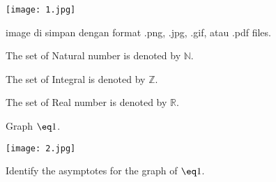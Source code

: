 \documentclass[11pt]{article}
\begin{document}
	
	\begin{center}
	\texttt{[image: 1.jpg]}
	
	image di simpan dengan format .png, .jpg, .gif, atau .pdf files.
	\end{center}
	
	The set of Natural number is denoted by $\mathbb{N}$.
	
	The set of Integral is denoted by $\mathbb{Z}$.
	
	The set of Real number is denoted by $\mathbb{R}$.
	
	Graph $\eq1$. 
	
	\texttt{[image: 2.jpg]}
	
	Identify the asymptotes for the graph of $\eq1$.
	
\end{document}
